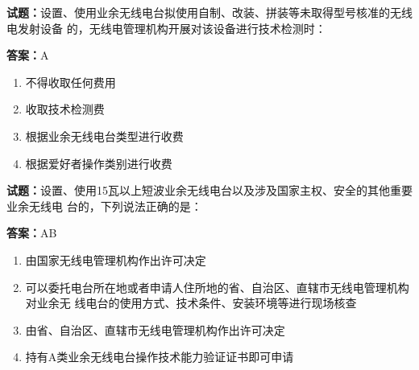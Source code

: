 \documentclass{ctexbook}
\begin{document}




\vspace{1em}

\textbf{试题：}设置、使用业余无线电台拟使用自制、改装、拼装等未取得型号核准的无线电发射设备
的，无线电管理机构开展对该设备进行技术检测时： 


\textbf{答案：}A 

\begin{enumerate}[leftmargin=3em]
  \item 不得收取任何费用 

  \item 收取技术检测费 

  \item 根据业余无线电台类型进行收费 

  \item 根据爱好者操作类别进行收费 

\end{enumerate}





\vspace{1em}

\textbf{试题：}设置、使用15瓦以上短波业余无线电台以及涉及国家主权、安全的其他重要业余无线电
台的，下列说法正确的是： 

\textbf{答案：}AB 

\begin{enumerate}[leftmargin=3em]
  \item 由国家无线电管理机构作出许可决定 

  \item 可以委托电台所在地或者申请人住所地的省、自治区、直辖市无线电管理机构对业余无
线电台的使用方式、技术条件、安装环境等进行现场核查 

  \item 由省、自治区、直辖市无线电管理机构作出许可决定 

  \item 持有A类业余无线电台操作技术能力验证证书即可申请 

\end{enumerate}





\vspace{1em}
\end{document}
